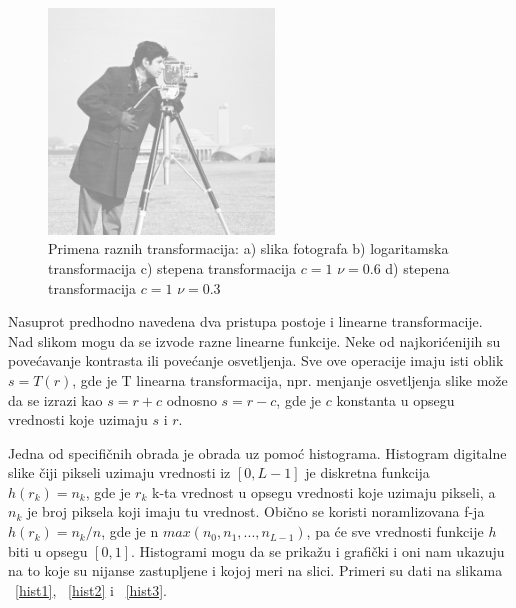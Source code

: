 \documentclass[a4paper,12pt,titlepage]{article}
\begin{document}
\begin{figure}[ht!]
\includegraphics[width=60mm]{img/imgPow2.png}
\caption{Primena raznih transformacija: a) slika fotografa b) logaritamska transformacija c) stepena transformacija $c = 1$ $\nu = 0.6$ d) stepena transformacija $c = 1$ $\nu = 0.3$}
\label{transf}
\end{figure} 

Nasuprot predhodno navedena dva pristupa postoje i linearne transformacije. Nad slikom mogu da se izvode razne linearne funkcije. Neke od najkorićenijih su povećavanje kontrasta ili povećanje osvetljenja. Sve ove operacije imaju isti oblik $s = T(r)$, gde je T linearna transformacija, npr. menjanje osvetljenja slike može da se izrazi kao $s = r + c$ odnosno $s = r - c$, gde je $c$ konstanta u opsegu vrednosti koje uzimaju $s$ i $r$. 

Jedna od specifičnih obrada je obrada uz pomoć histograma. Histogram digitalne slike čiji pikseli uzimaju vrednosti iz $[0, L - 1]$ je diskretna funkcija $h(r_{k}) = n_{k}$, gde je $r_{k}$ k-ta vrednost u opsegu vrednosti koje uzimaju pikseli, a $n_{k}$ je broj piksela koji imaju tu vrednost. Obično se koristi noramlizovana f-ja $h(r_{k}) = n_{k}/n$, gde je n $max(n_{0}, n_{1}, ... , n_{L - 1})$, pa će sve vrednosti funkcije $h$ biti u opsegu $[0, 1]$. Histogrami mogu da se prikažu i grafički i oni nam ukazuju na to koje su nijanse zastupljene i kojoj meri na slici. Primeri su dati na slikama ~\ref{hist1},  ~\ref{hist2} i ~\ref{hist3}.
\end{document}
